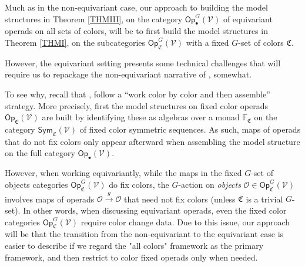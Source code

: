 \documentclass[a4paper,10pt
,draft
]{article}%
\numberwithin{equation}{section}
\numberwithin{figure}{section}
\theoremstyle{definition} %
\newcommand{\V}{\ensuremath{\mathcal V}}
\renewcommand{\O}{\ensuremath{\mathcal O}}
\newcommand{\1}{\ensuremath{\mathbbm 1}}%
\begin{document}
Much as in the non-equivariant case, 
our approach to building the model structures
in Theorem \ref{THMIII},
on the category $\mathsf{Op}^G_{\bullet}(\V)$
of equivariant operads on all sets of colors,
will be to first build the model structures in Theorem \ref{THMI},
on the subcategories $\mathsf{Op}^G_{\mathfrak{C}}(\V)$
with a fixed $G$-set of colors $\mathfrak{C}$.

However, the equivariant setting presents some technical challenges that will require us to repackage the non-equivariant narrative of
\cite{CM13b},\cite{Cav} somewhat.

To see why, recall that \cite{CM13b},\cite{Cav}
follow a ``work color by color and then assemble'' strategy.
More precisely, first the model structures on fixed color operads 
$\mathsf{Op}_{\mathfrak{C}}(\V)$
are built by identifying these as algebras over a monad
$\mathbb{F}_{\mathfrak{C}}$
on the category $\mathsf{Sym}_{\mathfrak{C}}(\V)$
of fixed color symmetric sequences.
As such, maps of operads that do not fix colors
only appear afterward when assembling the model structure on the full category $\mathsf{Op}_{\bullet}(\V)$.

However, when working equivariantly, 
while the maps in the fixed $G$-set of objects categories 
$\mathsf{Op}^G_{\mathfrak{C}}(\V)$ do fix colors, 
the $G$-action on \emph{objects}
$\O \in \mathsf{Op}^G_{\mathfrak{C}}(\V)$
involves maps of operads $\O \xrightarrow{g} \O$
that need not fix colors (unless $\mathfrak{C}$ is a trivial $G$-set).
In other words, when discussing equivariant operads,
even the fixed color categories 
$\mathsf{Op}^G_{\mathfrak{C}}(\V)$
require color change data.
Due to this issue, 
our approach will be that the transition from the non-equivariant to the equivariant case is easier to describe 
if we regard the "all colors" framework as the primary framework,
and then restrict to color fixed operads only when needed.
\end{document}

